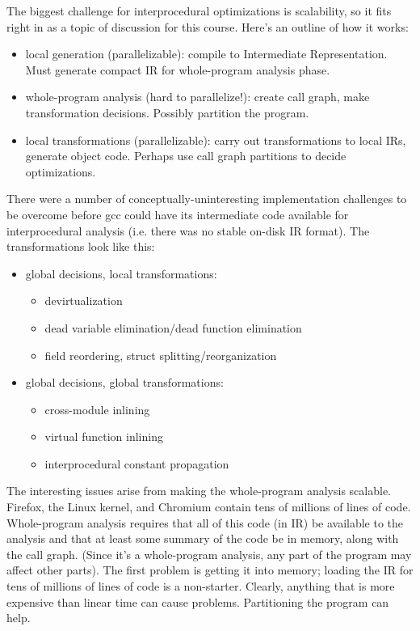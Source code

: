 The biggest challenge for interprocedural optimizations is scalability, so 
it fits right in as a topic of discussion for this course.
Here's an outline of how it works:
\begin{itemize}[noitemsep]
\item local generation (parallelizable): compile to Intermediate Representation. Must generate compact
IR for whole-program analysis phase.
\item whole-program analysis (hard to parallelize!): create call graph, make transformation decisions. Possibly partition
the program.
\item local transformations (parallelizable): carry out transformations to local IRs, generate object code.
Perhaps use call graph partitions to decide optimizations. 
\end{itemize}
There were a number of conceptually-uninteresting implementation
challenges to be overcome before gcc could have its intermediate code available for
interprocedural analysis (i.e. there was no stable on-disk IR format). The transformations look like this:
\begin{itemize}[noitemsep]
\item global decisions, local transformations:
\begin{itemize}[noitemsep]
\item devirtualization
\item dead variable elimination/dead function elimination
\item field reordering, struct splitting/reorganization
\end{itemize}
\item global decisions, global transformations:
\begin{itemize}[noitemsep]
\item cross-module inlining
\item virtual function inlining
\item interprocedural constant propagation
\end{itemize}
\end{itemize}
The interesting issues arise from making the whole-program analysis scalable. Firefox, the Linux kernel,
and Chromium contain tens of millions of lines of code. Whole-program analysis requires that all of 
this code (in IR) be available to the analysis and that at least some summary of the code be in memory, 
along with the call graph.
(Since it's a whole-program analysis, any part of the program may affect other parts). The first problem
is getting it into memory; loading the IR for tens of millions of lines of code is a non-starter.
Clearly, anything that is more expensive than linear time can cause problems. Partitioning the program
can help.

